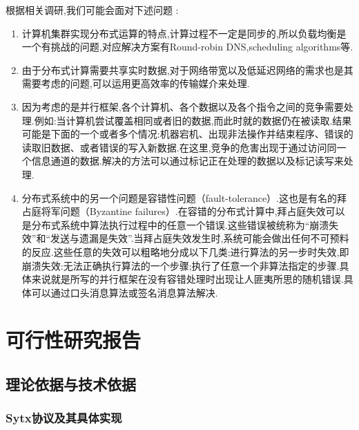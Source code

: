 \documentclass[paper=a4]{ctexart} %
\numberwithin{equation}{section} %
\numberwithin{figure}{section} %
\numberwithin{table}{section} %
\begin{document}
根据相关调研,我们可能会面对下述问题 : 
\begin{enumerate}
\item 计算机集群实现分布式运算的特点,计算过程不一定是同步的,所以负载均衡是一个有挑战的问题,对应解决方案有Round-robin DNS,scheduling algorithms等.
\item 由于分布式计算需要共享实时数据,对于网络带宽以及低延迟网络的需求也是其需要考虑的问题,可以运用更高效率的传输媒介来处理.
\item 因为考虑的是并行框架,各个计算机、各个数据以及各个指令之间的竞争需要处理.例如:当计算机尝试覆盖相同或者旧的数据,而此时就的数据仍在被读取.结果可能是下面的一个或者多个情况:机器宕机、出现非法操作并结束程序、错误的读取旧数据、或者错误的写入新数据.在这里,竞争的危害出现于通过访问同一个信息通道的数据.解决的方法可以通过标记正在处理的数据以及标记读写来处理.   
\item 分布式系统中的另一个问题是容错性问题（fault-tolerance）.这也是有名的拜占庭将军问题（Byzantine failures）.在容错的分布式计算中,拜占庭失效可以是分布式系统中算法执行过程中的任意一个错误.这些错误被统称为“崩溃失效”和“发送与遗漏是失效”.当拜占庭失效发生时,系统可能会做出任何不可预料的反应.这些任意的失效可以粗略地分成以下几类;进行算法的另一步时失效,即崩溃失效:无法正确执行算法的一个步骤;执行了任意一个非算法指定的步骤.具体来说就是所写的并行框架在没有容错处理时出现让人匪夷所思的随机错误.具体可以通过口头消息算法或签名消息算法解决.
\end{enumerate}
 

\section{可行性研究报告}

\subsection{理论依据与技术依据}

\subsubsection{Sytx协议及其具体实现}
\end{document}
